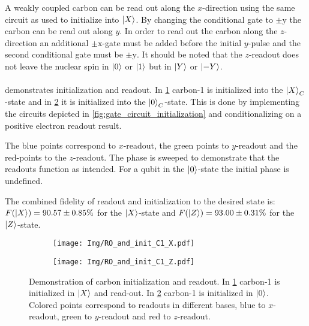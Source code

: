 A weakly coupled carbon can be read out along the $x$-direction using the same circuit as used to initialize into ${\left\vert{X}\right\rangle}$.
By changing the conditional gate to $\pm \mathrm{y}$ the carbon can be read out along $y$.
In order to read out the carbon along the $z$-direction an additional $\pm \mathrm{x}$-gate must be added before the initial $y$-pulse and the second conditional gate must be $\pm \mathrm{y}$. It should be noted that the $z$-readout does not leave the nuclear spin in ${\left\vert{0}\right\rangle}$ or ${\left\vert{1}\right\rangle}$ but in ${\left\vert{Y}\right\rangle}$ or ${\left\vert{-Y}\right\rangle}$.

\paragraph{}
 demonstrates initialization and readout.
In \cref{fig:carbon_init_x} carbon-1 is initialized into the ${\left\vert{X}\right\rangle}_C$-state and in \cref{fig:carbon_init_Z} it is initialized into the ${\left\vert{0}\right\rangle}_C$-state.
This is done by implementing the circuits depicted in \cref{fig:gate_circuit_initialization} and conditionalizing on a positive electron readout result.

The blue points correspond to $x$-readout, the green points to $y$-readout and the red-points to the $z$-readout.
The phase is sweeped to demonstrate that the readouts function as intended.
For a qubit in the ${\left\vert{0}\right\rangle}$-state the initial phase is undefined.

The combined fidelity of readout and initialization to the desired state is: $F({\left\vert{X}\right\rangle}) = 90.57 \pm 0.85 \% $ for the ${\left\vert{X}\right\rangle}$-state and $F({\left\vert{Z}\right\rangle}) = 93.00 \pm 0.31 \%$ for the ${\left\vert{Z}\right\rangle}$-state.

\begin{figure}[htbp]
    \begin{subfigure}[t]{0.49\textwidth}\centering
        \caption{}
        \texttt{[image: Img/RO\_and\_init\_C1\_X.pdf]}
        \label{fig:carbon_init_x}
    \end{subfigure}
        \begin{subfigure}[t]{0.49\textwidth}\centering
        \caption{}
        \texttt{[image: Img/RO\_and\_init\_C1\_Z.pdf]}
        \label{fig:carbon_init_Z}
    \end{subfigure}
    \caption{Demonstration of carbon initialization and readout. In \cref{fig:carbon_init_x} carbon-1 is initialized in ${\left\vert{X}\right\rangle}$ and read-out. In \cref{fig:carbon_init_Z} carbon-1 is initialized in ${\left\vert{0}\right\rangle}$. Colored points correspond to readouts in different bases, blue to $x$-readout, green to $y$-readout and red to $z$-readout.}
    \label{fig:single_qubit_initialization}
\end{figure}


